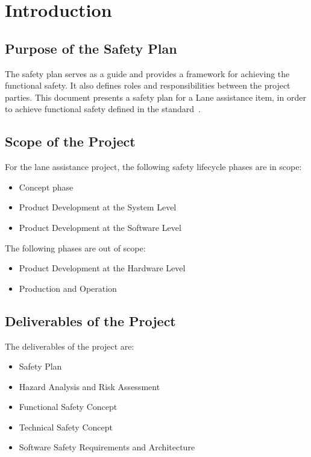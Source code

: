 \chapter{Introduction}
\label{ch:introduction}

\section{Purpose of the Safety Plan}

The safety plan serves as a guide and provides a framework for achieving the
functional safety. It also defines roles and responsibilities between the
project parties. This document presents a safety plan for a Lane assistance
item, in order to achieve functional safety defined in the
standard~\cite{iso26262}.

\section{Scope of the Project}

For the lane assistance project, the following safety lifecycle phases are in scope:

\begin{itemize}
  \item Concept phase
  \item Product Development at the System Level
  \item Product Development at the Software Level
\end{itemize}

The following phases are out of scope:

\begin{itemize}
  \item Product Development at the Hardware Level
  \item Production and Operation
\end{itemize}

\section{Deliverables of the Project}

The deliverables of the project are:
\begin{itemize}
  \item Safety Plan
  \item Hazard Analysis and Risk Assessment
  \item Functional Safety Concept
  \item Technical Safety Concept
  \item Software Safety Requirements and Architecture
\end{itemize}

